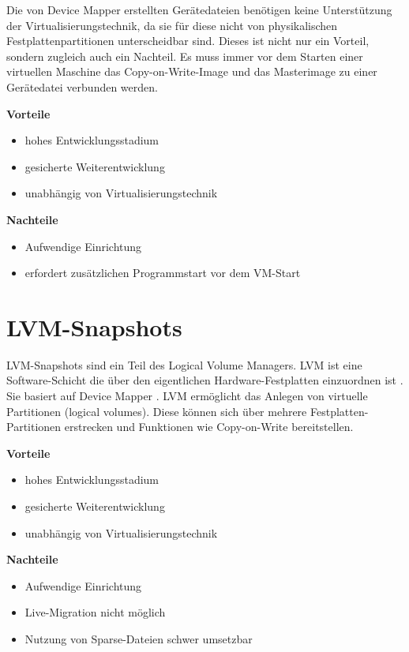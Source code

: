 Die von Device Mapper erstellten Gerätedateien benötigen keine Unterstützung der Virtualisierungstechnik, da sie für diese nicht von physikalischen Festplattenpartitionen unterscheidbar sind. Dieses ist nicht nur ein Vorteil, sondern zugleich auch ein Nachteil. Es muss immer vor dem Starten einer virtuellen Maschine das Copy-on-Write-Image und das Masterimage zu einer Gerätedatei verbunden werden.  

\textbf{Vorteile}
\begin{itemize}
 \item hohes Entwicklungsstadium
 \item gesicherte Weiterentwicklung
 \item unabhängig von Virtualisierungstechnik
\end{itemize}

\textbf{Nachteile}
\begin{itemize}
 \item Aufwendige Einrichtung
 \item erfordert zusätzlichen Programmstart vor dem VM-Start
\end{itemize}

\section{LVM-Snapshots}
LVM-Snapshots sind ein Teil des Logical Volume Managers. LVM ist eine Software-Schicht die über den eigentlichen Hardware-Festplatten einzuordnen ist \cite{lvmselflinux} \cite{lvmhowto}. Sie basiert auf Device Mapper \cite{lvmsource}. LVM ermöglicht das Anlegen von virtuelle Partitionen (logical volumes). Diese können sich über mehrere Festplatten-Partitionen erstrecken und Funktionen wie Copy-on-Write bereitstellen.

\textbf{Vorteile}
\begin{itemize}
 \item hohes Entwicklungsstadium
 \item gesicherte Weiterentwicklung
 \item unabhängig von Virtualisierungstechnik
\end{itemize}

\textbf{Nachteile}
\begin{itemize}
 \item Aufwendige Einrichtung
 \item Live-Migration nicht möglich
 \item Nutzung von Sparse-Dateien schwer umsetzbar
\end{itemize}

